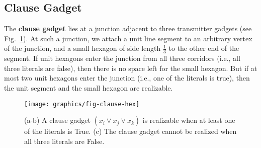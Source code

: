 \subsection{Clause Gadget}
The {\bf clause gadget} lies at a junction adjacent to three transmitter gadgets (see Fig.~\ref{fig:clause}). At such a junction, we attach a unit line segment to an arbitrary vertex of the junction, and a small hexagon of side length $\frac{1}{3}$ to the other end of the segment. If unit hexagons enter the junction from all three corridors (i.e., all three literals are false), then there is no space left for the small hexagon. But if at most two unit hexagons enter the junction (i.e., one of the literals is true), then the unit segment and the small hexagon are realizable.
\begin{figure}[htbp]
	\centering
	\texttt{[image: graphics/fig-clause-hex]}
	\caption{(a-b) A clause gadget $(x_i\vee x_j\vee x_k)$ is
    realizable when at least one of the literals is {\sc True}.
    (c) The clause gadget cannot be realized when all three literals are {\sc False}.}
	\label{fig:clause}
\end{figure}

